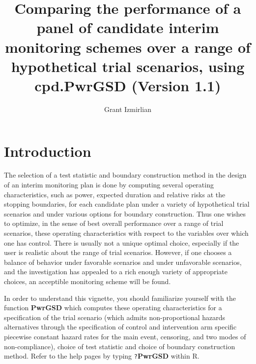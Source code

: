 \documentclass{article}
\begin{document}
\title{Comparing the performance of a panel of candidate interim monitoring schemes over
  a range of hypothetical trial scenarios, using cpd.PwrGSD (Version 1.1)}
\author{Grant Izmirlian}
\maketitle

\section{Introduction}
The selection of a test statistic and boundary construction method in the design of an
interim monitoring plan is done by computing several operating characteristics, such as
power, expected duration and relative risks at the stopping boundaries, for each candidate
plan under a variety of hypothetical trial scenarios and under various options for
boundary construction. Thus one wishes to optimize, in the sense of best overall
performance over a range of trial scenarios, these operating characteristics with respect
to the variables over which one has control.  There is usually not a unique optimal
choice, especially if the user is realistic about the range of trial scenarios. However,
if one chooses a balance of behavior under favorable scenarios and under unfavorable
scenarios, and the investigation has appealed to a rich enough variety of appropriate 
choices, an acceptible monitoring scheme will be found. 


In order to understand this vignette, you should familiarize
yourself with the function {\bf PwrGSD} which computes these operating characteristics
for a specification of the trial scenario (which admits non-proportional hazards
alternatives through the specification of control and intervention arm specific piecewise
constant hazard rates for the main event, censoring, and two modes of non-compliance),
choice of test statistic and choice of boundary construction method. Refer to the help
pages by typing \verb`?`{\bf PwrGSD} within R. 
\end{document}
